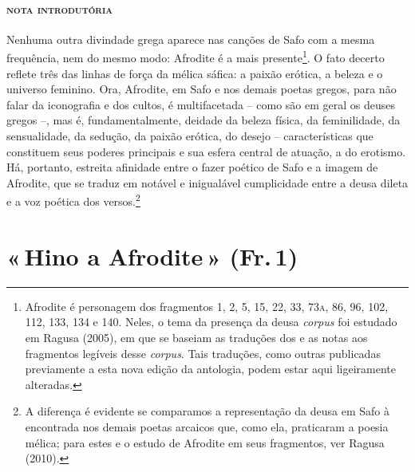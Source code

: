 \paragraph{\textsc{nota introdutória}} 
Nenhuma outra divindade grega aparece nas canções de Safo com a mesma
frequência, nem do mesmo modo: Afrodite é a mais presente\footnote{ Afrodite é
personagem dos fragmentos 1, 2, 5, 15, 22, 33, 73\textsc{a}, 86, 96, 102, 112, 133, 134
e 140. Neles, o tema da presença da deusa \textit{corpus} foi estudado em Ragusa (2005), em que se baseiam as traduções dos e as notas aos fragmentos legíveis desse \textit{corpus}. Tais traduções, como outras publicadas previamente a esta nova edição da antologia, podem estar aqui ligeiramente alteradas.}. O fato
decerto reflete três das linhas de força da mélica sáfica: a
paixão erótica, a beleza e o universo feminino. Ora, Afrodite, em Safo e nos
demais poetas gregos, para não falar da iconografia e dos cultos, é
multifacetada -- como são em geral os deuses gregos --, mas é, fundamentalmente,
deidade da beleza física, da feminilidade, da sensualidade, da sedução, da
paixão erótica, do desejo -- características que constituem seus poderes
principais e sua esfera central de atuação, a do erotismo. Há, portanto,
estreita afinidade entre o fazer poético de Safo e a imagem de Afrodite, que se
traduz em notável e inigualável cumplicidade entre a deusa dileta e a voz
poética dos versos.\footnote{ A diferença é evidente se comparamos a
representação da deusa em Safo à encontrada nos demais poetas arcaicos que, como ela, praticaram a poesia mélica; para estes e o estudo de Afrodite em seus fragmentos, ver Ragusa (2010).}

\pagebreak
\section{«\,Hino a Afrodite\,» (Fr.\,1)} 

